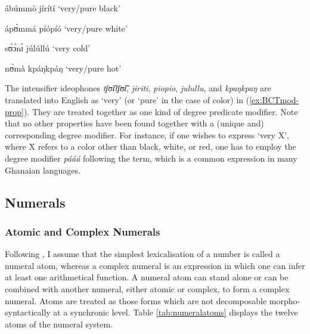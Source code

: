 \begin{exe}
\begin{exe}
\begin{exe}
{\begin{exe}
\begin{exe}
\begin{exe}
\begin{exe}
\begin{exe}
\begin{exe}
\begin{exe}
\begin{xlist}
\begin{exe}
\begin{exe}
\begin{exe}
\ex ábúmmò jírítí    {\rm `very/pure black'}
\label{ex:BCTmod-prop-black} 

\ex  ápʊ̀mmá píópíó  {\rm `very/pure  white'}
\label{ex:BCTmod-prop-white}

\ex  sʊ́ɔ́nɪ̀ júlúllú  {\rm `very cold'}
\label{ex:BCTmod-prop-cold}

\ex   nʊ̀mà kpáŋkpáŋ  {\rm `very/pure hot'}
\label{ex:BCTmod-prop-hot}


\z
\z

The  intensifier ideophones  {\it tʃʊ̃ɪ̃tʃʊ̃ɪ̃},  {\it jiriti},  {\it piopio},  
{\it julullu},  and    {\it kpaŋkpaŋ} are translated into English as `very' (or  
`pure' in the case of color) in (\ref{ex:BCTmod-prop}). They are treated 
together as one kind of degree predicate modifier.  Note that no other 
properties have been found together with a (unique and) corresponding degree 
modifier. For instance, if one wishes to express `very X', where X refers to a 
color other than black, white, or red,   one has to employ the degree modifier 
{\it pááá} following the term, which is a common expression in many Ghanaian 
languages. 


 \subsection{Numerals}
\label{sec:GRM-numeral}


\subsubsection{Atomic and Complex Numerals}
\label{sec:NUM-bas-comp}


Following \citet[263]{Gree78b}, I assume that  the simplest lexicalisation of a 
number is called a numeral
atom, whereas a complex numeral is an expression in which  one can infer at
least one arithmetical function.  A numeral atom can stand alone or can
be combined
with another numeral, either atomic or complex, to form a complex numeral. Atoms
are treated as  those forms which are not decomposable morpho-syntactically at a
synchronic level. Table \ref{tab:numeralatoms} displays the twelve
atoms of the numeral system.


\end{exe}
\end{exe}
\end{exe}
\end{xlist}
\end{exe}
\end{exe}
\end{exe}
\end{exe}
\end{exe}
\end{exe}
\end{exe}}
\end{exe}
\end{exe}
\end{exe}
